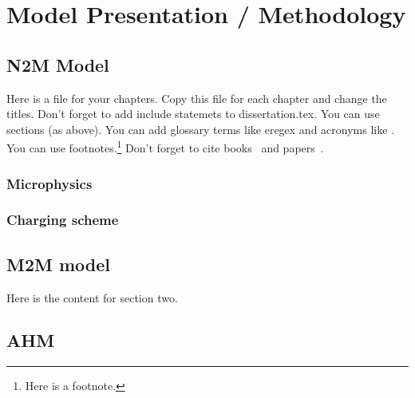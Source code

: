  
\chapter{Model Presentation / Methodology}
\resetfootnote %

\section{N2M Model}

Here is a file for your chapters.  Copy this file for each chapter 
and change the titles.  Don't forget to add include statemets to 
dissertation.tex.  
You can use sections (as above).  
You can add glossary terms like \gls{eregex} and acronyms like .
You can use footnotes.\footnote{Here is a footnote.}
Don't forget to cite books~\cite{Sipser} and papers~\cite{CarleNarendran}.

\subsection{Microphysics}
\subsection{Charging scheme}

\section{M2M model }

Here is the content for section two.

\section{AHM}
